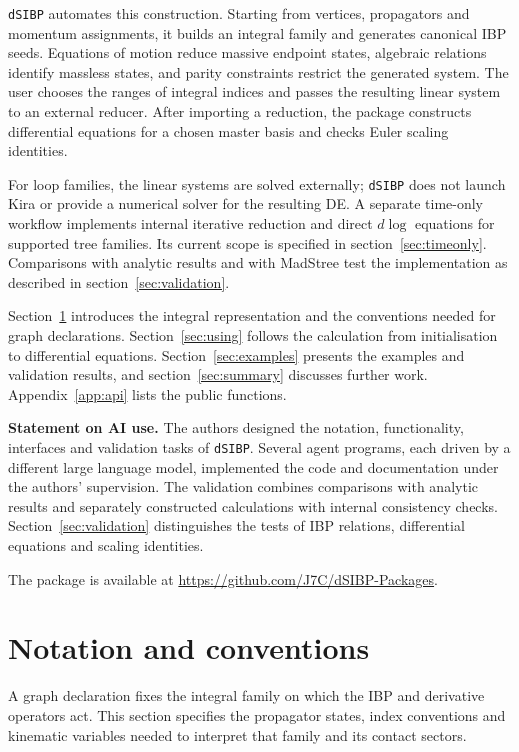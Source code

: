 \documentclass[11pt,a4paper]{article}
\begin{document}
\texttt{dSIBP} automates this construction. Starting from vertices, propagators and momentum
assignments, it builds an integral family and generates canonical IBP seeds. Equations of motion
reduce massive endpoint states, algebraic relations identify massless states, and parity
constraints restrict the generated system. The user chooses the ranges of integral indices and
passes the resulting linear system to an external reducer. After importing a reduction, the
package constructs differential equations for a chosen master basis and checks Euler scaling
identities.

For loop families, the linear
systems are solved externally; \texttt{dSIBP} does not launch Kira or provide a numerical solver
for the resulting DE. A separate time-only workflow implements internal iterative reduction and
direct $d\log$ equations for supported tree families. Its current scope is specified in
section~\ref{sec:timeonly}. Comparisons with analytic results and with MadStree
\cite{MadStree:inpreparation} test the implementation as described in
section~\ref{sec:validation}.

Section~\ref{sec:notation} introduces the integral representation and the conventions needed for
graph declarations. Section~\ref{sec:using} follows the calculation from initialisation to
differential equations. Section~\ref{sec:examples} presents the examples and validation results,
and section~\ref{sec:summary} discusses further work. Appendix~\ref{app:api} lists the public
functions.

\noindent\textbf{Statement on AI use.}
The authors designed the notation, functionality, interfaces and validation tasks of \texttt{dSIBP}.
Several agent programs, each driven by a different large language model, implemented the code and
documentation under the authors' supervision. The validation combines comparisons with analytic results and separately constructed
calculations with internal consistency checks. Section~\ref{sec:validation} distinguishes the
tests of IBP relations, differential equations and scaling identities.

\noindent The package is available at \url{https://github.com/J7C/dSIBP-Packages}.

\section{Notation and conventions}
\label{sec:notation}

A graph declaration fixes the integral family on which the IBP and derivative operators act.
This section specifies the propagator states, index conventions and kinematic variables needed
to interpret that family and its contact sectors.
\end{document}

